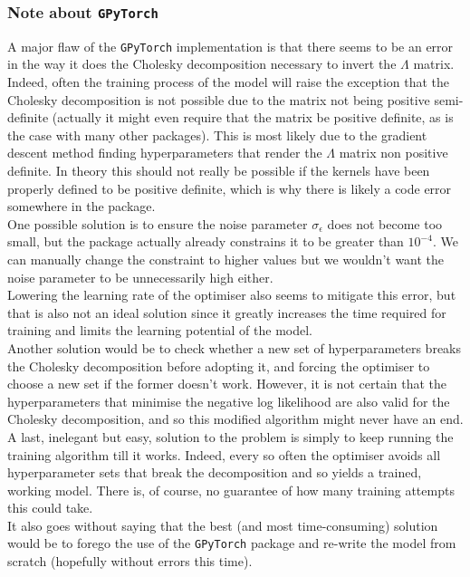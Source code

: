 \documentclass[a4paper,12pt]{article}
\begin{document}
\subsubsection{Note about \texttt{GPyTorch}}
A major flaw of the \texttt{GPyTorch} implementation is that there seems to be an error in the way it does the Cholesky decomposition necessary to invert the $\Lambda$ matrix. Indeed, often the training process of the model will raise the exception that the Cholesky decomposition is not possible due to the matrix not being positive semi-definite (actually it might even require that the matrix be positive definite, as is the case with many other packages). This is most likely due to the gradient descent method finding hyperparameters that render the $\Lambda$ matrix non positive definite. In theory this should not really be possible if the kernels have been properly defined to be positive definite, which is why there is likely a code error somewhere in the package.\\
One possible solution is to ensure the noise parameter $\sigma_\epsilon$ does not become too small, but the package actually already constrains it to be greater than $10^{-4}$. We can manually change the constraint to higher values but we wouldn't want the noise parameter to be unnecessarily high either.\\
Lowering the learning rate of the optimiser also seems to mitigate this error, but that is also not an ideal solution since it greatly increases the time required for training and limits the learning potential of the model.\\
Another solution would be to check whether a new set of hyperparameters breaks the Cholesky decomposition before adopting it, and forcing the optimiser to choose a new set if the former doesn't work. However, it is not certain that the hyperparameters that minimise the negative log likelihood are also valid for the Cholesky decomposition, and so this modified algorithm might never have an end.\\
A last, inelegant but easy, solution to the problem is simply to keep running the training algorithm till it works. Indeed, every so often the optimiser avoids all hyperparameter sets that break the decomposition and so yields a trained, working model. There is, of course, no guarantee of how many training attempts this could take.\\
It also goes without saying that the best (and most time-consuming) solution would be to forego the use of the \texttt{GPyTorch} package and re-write the model from scratch (hopefully without errors this time).
\end{document}
